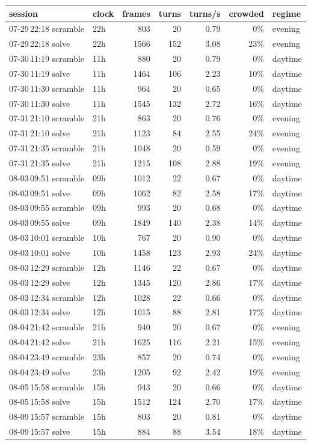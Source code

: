 \begin{tabular}{@{}llrrrrl@{}}
\toprule
session & clock & frames & turns & turns/s & crowded & regime \\
\midrule
07-29\,22:18 scramble & 22h & 803 & 20 & 0.79 & 0\% & evening \\
07-29\,22:18 solve & 22h & 1566 & 152 & 3.08 & 23\% & evening \\
07-30\,11:19 scramble & 11h & 880 & 20 & 0.79 & 0\% & daytime \\
07-30\,11:19 solve & 11h & 1464 & 106 & 2.23 & 10\% & daytime \\
07-30\,11:30 scramble & 11h & 964 & 20 & 0.65 & 0\% & daytime \\
07-30\,11:30 solve & 11h & 1545 & 132 & 2.72 & 16\% & daytime \\
07-31\,21:10 scramble & 21h & 863 & 20 & 0.76 & 0\% & evening \\
07-31\,21:10 solve & 21h & 1123 & 84 & 2.55 & 24\% & evening \\
07-31\,21:35 scramble & 21h & 1048 & 20 & 0.59 & 0\% & evening \\
07-31\,21:35 solve & 21h & 1215 & 108 & 2.88 & 19\% & evening \\
08-03\,09:51 scramble & 09h & 1012 & 22 & 0.67 & 0\% & daytime \\
08-03\,09:51 solve & 09h & 1062 & 82 & 2.58 & 17\% & daytime \\
08-03\,09:55 scramble & 09h & 993 & 20 & 0.68 & 0\% & daytime \\
08-03\,09:55 solve & 09h & 1849 & 140 & 2.38 & 14\% & daytime \\
08-03\,10:01 scramble & 10h & 767 & 20 & 0.90 & 0\% & daytime \\
08-03\,10:01 solve & 10h & 1458 & 123 & 2.93 & 24\% & daytime \\
08-03\,12:29 scramble & 12h & 1146 & 22 & 0.67 & 0\% & daytime \\
08-03\,12:29 solve & 12h & 1345 & 120 & 2.86 & 17\% & daytime \\
08-03\,12:34 scramble & 12h & 1028 & 22 & 0.66 & 0\% & daytime \\
08-03\,12:34 solve & 12h & 1015 & 88 & 2.81 & 17\% & daytime \\
08-04\,21:42 scramble & 21h & 940 & 20 & 0.67 & 0\% & evening \\
08-04\,21:42 solve & 21h & 1625 & 116 & 2.21 & 15\% & evening \\
08-04\,23:49 scramble & 23h & 857 & 20 & 0.74 & 0\% & evening \\
08-04\,23:49 solve & 23h & 1205 & 92 & 2.42 & 19\% & evening \\
08-05\,15:58 scramble & 15h & 943 & 20 & 0.66 & 0\% & daytime \\
08-05\,15:58 solve & 15h & 1512 & 124 & 2.70 & 17\% & daytime \\
08-09\,15:57 scramble & 15h & 803 & 20 & 0.81 & 0\% & daytime \\
08-09\,15:57 solve & 15h & 884 & 88 & 3.54 & 18\% & daytime \\
\bottomrule
\end{tabular}
